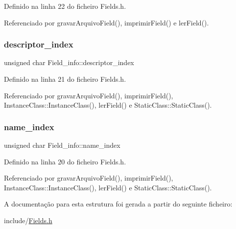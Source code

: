 Definido na linha 22 do ficheiro Fields.\+h.



Referenciado por gravar\+Arquivo\+Field(), imprimir\+Field() e ler\+Field().

\mbox{\label{structField__info_a317d816b6661095bde8c391905385f10}} 
\subsubsection{\texorpdfstring{descriptor\+\_\+index}{descriptor\_index}}
{\footnotesize\ttfamily unsigned char Field\+\_\+info\+::descriptor\+\_\+index}



Definido na linha 21 do ficheiro Fields.\+h.



Referenciado por gravar\+Arquivo\+Field(), imprimir\+Field(), Instance\+Class\+::\+Instance\+Class(), ler\+Field() e Static\+Class\+::\+Static\+Class().

\mbox{\label{structField__info_af4d468d17e45abb44e879e9c0f0b881d}} 
\subsubsection{\texorpdfstring{name\+\_\+index}{name\_index}}
{\footnotesize\ttfamily unsigned char Field\+\_\+info\+::name\+\_\+index}



Definido na linha 20 do ficheiro Fields.\+h.



Referenciado por gravar\+Arquivo\+Field(), imprimir\+Field(), Instance\+Class\+::\+Instance\+Class(), ler\+Field() e Static\+Class\+::\+Static\+Class().



A documentação para esta estrutura foi gerada a partir do seguinte ficheiro\+:\begin{DoxyCompactItemize}
\item 
include/\hyperlink{Fields_8h}{Fields.\+h}\end{DoxyCompactItemize}
